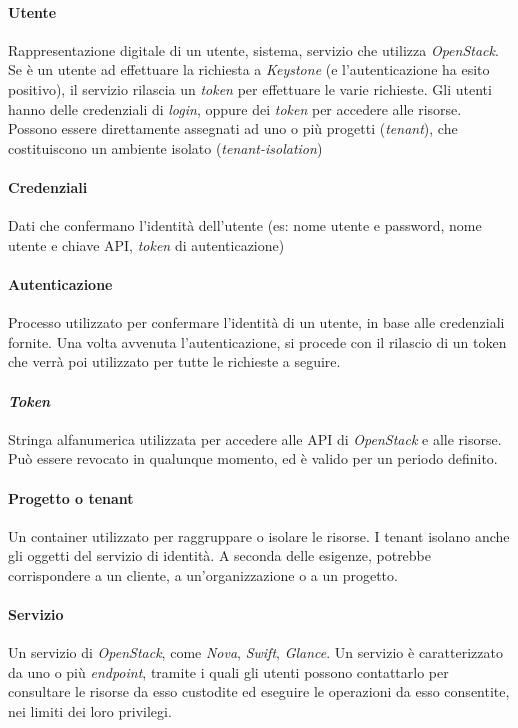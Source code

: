 \paragraph{Utente}
Rappresentazione digitale di un utente, sistema, servizio che utilizza \textit{OpenStack}.
Se è un utente ad effettuare la richiesta a \textit{Keystone} (e l'autenticazione ha esito positivo), il servizio rilascia un \textit{token} per effettuare le varie richieste.
Gli utenti hanno delle credenziali di \textit{login}, oppure dei \textit{token} per accedere alle risorse.
Possono essere direttamente assegnati ad uno o più progetti (\textit{tenant}), che costituiscono un ambiente isolato (\textit{tenant-isolation})\cite{KeystoneConcepts}
\paragraph{Credenziali}
Dati che confermano l'identità dell'utente (es: nome utente e password, nome utente e chiave API, \textit{token} di autenticazione)\cite{KeystoneConcepts}
\paragraph{Autenticazione}
Processo utilizzato per confermare l'identità di un utente, in base alle credenziali fornite.
Una volta avvenuta l'autenticazione, si procede con il rilascio di un token che verrà poi utilizzato per tutte le richieste a seguire.\cite{KeystoneConcepts}
\paragraph{\textit{Token}}
Stringa alfanumerica utilizzata per accedere alle API di \textit{OpenStack} e alle risorse. Può essere revocato in qualunque momento, ed è valido per un periodo definito.\cite{KeystoneConcepts}
\paragraph{Progetto o tenant}
Un container utilizzato per raggruppare o isolare le risorse. I tenant isolano anche gli oggetti del servizio di identità.
A seconda delle esigenze, potrebbe corrispondere a un cliente, a un'organizzazione o a un progetto.
\paragraph{Servizio}
Un servizio di \textit{OpenStack}, come \textit{Nova}, \textit{Swift}, \textit{Glance}. Un servizio è caratterizzato da uno o più \textit{endpoint}, tramite i quali gli utenti possono contattarlo per consultare le risorse da esso custodite ed eseguire le operazioni da esso consentite, nei limiti dei loro privilegi.\cite{KeystoneConcepts}
